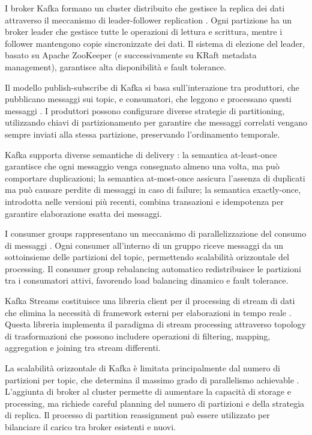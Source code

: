 I broker Kafka formano un cluster distribuito che gestisce la replica dei dati attraverso il meccanismo di leader-follower replication \cite{stopford2018designing}. Ogni partizione ha un broker leader che gestisce tutte le operazioni di lettura e scrittura, mentre i follower mantengono copie sincronizzate dei dati. Il sistema di elezione del leader, basato su Apache ZooKeeper (e successivamente su KRaft metadata management), garantisce alta disponibilità e fault tolerance.

Il modello publish-subscribe di Kafka si basa sull'interazione tra produttori, che pubblicano messaggi sui topic, e consumatori, che leggono e processano questi messaggi \cite{kreps2014kafka}. I produttori possono configurare diverse strategie di partitioning, utilizzando chiavi di partizionamento per garantire che messaggi correlati vengano sempre inviati alla stessa partizione, preservando l'ordinamento temporale.

Kafka supporta diverse semantiche di delivery \cite{narkhede2017kafka}: la semantica at-least-once garantisce che ogni messaggio venga consegnato almeno una volta, ma può comportare duplicazioni; la semantica at-most-once assicura l'assenza di duplicati ma può causare perdite di messaggi in caso di failure; la semantica exactly-once, introdotta nelle versioni più recenti, combina transazioni e idempotenza per garantire elaborazione esatta dei messaggi.

I consumer groups rappresentano un meccanismo di parallelizzazione del consumo di messaggi \cite{garg2013apache}. Ogni consumer all'interno di un gruppo riceve messaggi da un sottoinsieme delle partizioni del topic, permettendo scalabilità orizzontale del processing. Il consumer group rebalancing automatico redistribuisce le partizioni tra i consumatori attivi, favorendo load balancing dinamico e fault tolerance.

Kafka Streams costituisce una libreria client per il processing di stream di dati che elimina la necessità di framework esterni per elaborazioni in tempo reale \cite{stopford2018designing}. Questa libreria implementa il paradigma di stream processing attraverso topology di trasformazioni che possono includere operazioni di filtering, mapping, aggregation e joining tra stream differenti.

La scalabilità orizzontale di Kafka è limitata principalmente dal numero di partizioni per topic, che determina il massimo grado di parallelismo achievable \cite{narkhede2017kafka}. L'aggiunta di broker al cluster permette di aumentare la capacità di storage e processing, ma richiede careful planning del numero di partizioni e della strategia di replica. Il processo di partition reassignment può essere utilizzato per bilanciare il carico tra broker esistenti e nuovi.

